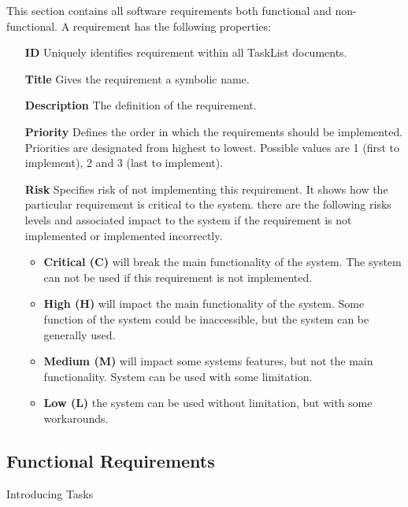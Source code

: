 This section contains all software requirements both functional and non-functional.
A requirement has the following properties:
\begin{itemize}
	\item[\bf{ID}] Uniquely identifies requirement within all TaskList documents.
	\item[\bf{Title}] Gives the requirement a symbolic name.
	\item[\bf{Description}] The definition of the requirement.
	\item[\bf{Priority}] Defines the order in which the requirements should be implemented. Priorities are designated from highest to lowest.
	Possible values are 1 (first to implement), 2 and 3 (last to implement).
	\item[\bf{Risk}] Specifies risk of not implementing this requirement. It shows how the particular requirement is critical to the system.
	there are the following risks levels and associated impact to the system if the requirement is not implemented or implemented incorrectly.
		\begin{itemize}
			\item {\bf Critical (C)}  will break the main functionality of the system. The system can not be used if this requirement is not implemented.
			\item {\bf High (H)} will impact the main functionality of the system. Some function of the system could be inaccessible, but the 
			system can be generally used.
			\item {\bf Medium (M)} will impact some systems features, but not the main functionality. System can be used with some limitation.
			\item {\bf Low (L)} the system can be used without limitation, but with some workarounds.

		\end{itemize}

  \end{itemize}


\subsection{Functional Requirements}
\label{requirements:functional}

\begin{requirement}{Introducing Tasks}
	\label{requirements:functional:tasks}
\end{requirement}

